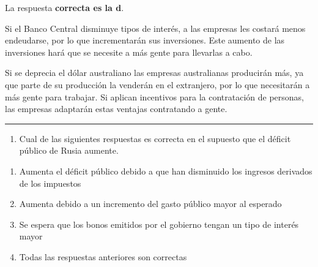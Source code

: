 \documentclass[
  letterpaper,
  DIV=11,
  numbers=noendperiod]{scrreprt}
\providecommand{\tightlist}{%
  \setlength{\itemsep}{0pt}\setlength{\parskip}{0pt}}\usepackage{longtable,booktabs,array}
\begin{document}
\begin{tcolorbox}[enhanced jigsaw, left=2mm, opacityback=0, colback=white, breakable, arc=.35mm, bottomrule=.15mm, rightrule=.15mm, toprule=.15mm, leftrule=.75mm, colframe=quarto-callout-tip-color-frame]
\begin{minipage}[t]{5.5mm}
\textcolor{quarto-callout-tip-color}{\faLightbulb}
\end{minipage}%
\begin{minipage}[t]{\textwidth - 5.5mm}

La respuesta \textbf{correcta es la d}.

Si el Banco Central disminuye tipos de interés, a las empresas les
costará menos endeudarse, por lo que incrementarán sus inversiones. Este
aumento de las inversiones hará que se necesite a más gente para
llevarlas a cabo.

Si se deprecia el dólar australiano las empresas australianas producirán
más, ya que parte de su producción la venderán en el extranjero, por lo
que necesitarán a más gente para trabajar. Si aplican incentivos para la
contratación de personas, las empresas adaptarán estas ventajas
contratando a gente.

\end{minipage}%
\end{tcolorbox}

\begin{center}\rule{0.5\linewidth}{0.5pt}\end{center}

\begin{enumerate}
\def\labelenumi{\arabic{enumi}.}
\setcounter{enumi}{5}
\tightlist
\item
  Cual de las siguientes respuestas es correcta en el supuesto que el
  déficit público de Rusia aumente.
\end{enumerate}

\begin{enumerate}
\def\labelenumi{\alph{enumi})}
\item
  Aumenta el déficit público debido a que han disminuido los ingresos
  derivados de los impuestos
\item
  Aumenta debido a un incremento del gasto público mayor al esperado
\item
  Se espera que los bonos emitidos por el gobierno tengan un tipo de
  interés mayor
\item
  Todas las respuestas anteriores son correctas
\end{enumerate}
\end{document}
